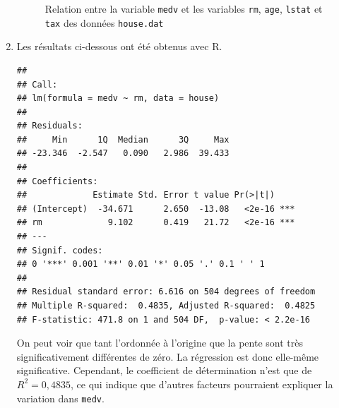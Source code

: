 \begin{solution}{2.17}
\begin{enumerate}
\begin{figure}
\begin{knitrout}
\end{knitrout}
        \caption{Relation entre la variable \texttt{medv} et les
          variables \texttt{rm}, \texttt{age}, \texttt{lstat} et
          \texttt{tax} des données \texttt{house.dat}}
        \label{fig:simple:house}
      \end{figure}
    \item Les résultats ci-dessous ont été obtenus avec \textsf{R}.
\begin{knitrout}
\color{fgcolor}\begin{kframe}
\begin{alltt}
 \hlkwb{<-}  \hlopt{~}   
\end{alltt}
\begin{verbatim}
##
## Call:
## lm(formula = medv ~ rm, data = house)
##
## Residuals:
##     Min      1Q  Median      3Q     Max
## -23.346  -2.547   0.090   2.986  39.433
##
## Coefficients:
##             Estimate Std. Error t value Pr(>|t|)
## (Intercept)  -34.671      2.650  -13.08   <2e-16 ***
## rm             9.102      0.419   21.72   <2e-16 ***
## ---
## Signif. codes:
## 0 '***' 0.001 '**' 0.01 '*' 0.05 '.' 0.1 ' ' 1
##
## Residual standard error: 6.616 on 504 degrees of freedom
## Multiple R-squared:  0.4835,	Adjusted R-squared:  0.4825
## F-statistic: 471.8 on 1 and 504 DF,  p-value: < 2.2e-16
\end{verbatim}
\end{kframe}
\end{knitrout}
      On peut voir que tant l'ordonnée à l'origine que la pente sont
      très significativement différentes de zéro. La régression est
      donc elle-même significative. Cependant, le coefficient de
      détermination n'est que de $R^2 =
      0,4835$, %
      ce qui indique que d'autres facteurs pourraient expliquer la
      variation dans \texttt{medv}.


\end{enumerate}
\end{solution}
